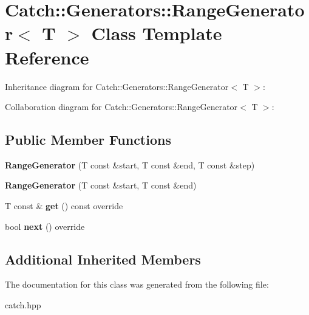 \hypertarget{classCatch_1_1Generators_1_1RangeGenerator}{}\section{Catch\+:\+:Generators\+:\+:Range\+Generator$<$ T $>$ Class Template Reference}
\label{classCatch_1_1Generators_1_1RangeGenerator}


Inheritance diagram for Catch\+:\+:Generators\+:\+:Range\+Generator$<$ T $>$\+:


Collaboration diagram for Catch\+:\+:Generators\+:\+:Range\+Generator$<$ T $>$\+:
\subsection*{Public Member Functions}
\begin{DoxyCompactItemize}
\item 
\mbox{\label{classCatch_1_1Generators_1_1RangeGenerator_a6a9b3cc009471c085c985642e0ab102e}} 
{\bfseries Range\+Generator} (T const \&start, T const \&end, T const \&step)
\item 
\mbox{\label{classCatch_1_1Generators_1_1RangeGenerator_ac999eb143945ff311b97d2c767df90d3}} 
{\bfseries Range\+Generator} (T const \&start, T const \&end)
\item 
\mbox{\label{classCatch_1_1Generators_1_1RangeGenerator_a2639173bb9f06ba353314cd226fcefec}} 
T const  \& {\bfseries get} () const override
\item 
\mbox{\label{classCatch_1_1Generators_1_1RangeGenerator_a4e6b2038832f09724d5a4355b4691259}} 
bool {\bfseries next} () override
\end{DoxyCompactItemize}
\subsection*{Additional Inherited Members}


The documentation for this class was generated from the following file\+:\begin{DoxyCompactItemize}
\item 
catch.\+hpp\end{DoxyCompactItemize}
